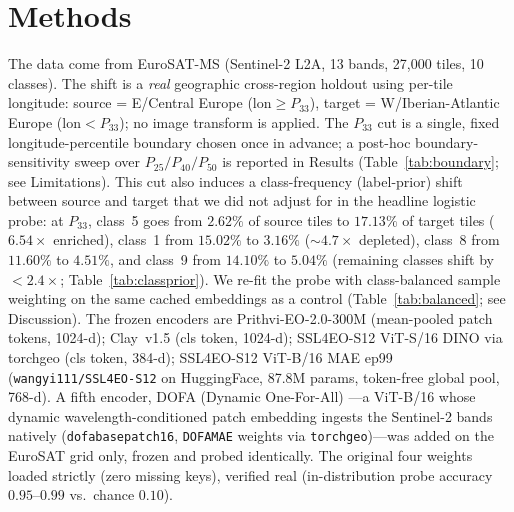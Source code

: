 \documentclass[journal]{IEEEtran}
\renewcommand{\_}{\textunderscore\allowbreak}
\begin{document}
\section{Methods}\label{sec:methods}
The data come from EuroSAT-MS \citep{helber2019eurosat} (Sentinel-2 L2A, 13 bands, 27{,}000 tiles, 10 classes). The shift is a
\emph{real} geographic cross-region holdout using per-tile longitude: source = E/Central Europe
($\mathrm{lon}\ge P_{33}$), target = W/Iberian-Atlantic Europe ($\mathrm{lon}<P_{33}$); no image transform is
applied. The $P_{33}$ cut is a single, fixed longitude-percentile boundary chosen once in advance; a post-hoc
boundary-sensitivity sweep over $P_{25}/P_{40}/P_{50}$ is reported in Results (Table~\ref{tab:boundary};
see Limitations). This cut also induces a class-frequency (label-prior) shift
between source and target that we did not adjust for in the headline logistic probe: at $P_{33}$, class~5
goes from $2.62\%$ of source tiles to $17.13\%$ of target tiles ($6.54\times$ enriched), class~1 from
$15.02\%$ to $3.16\%$ ($\sim\!4.7\times$ depleted), class~8 from $11.60\%$ to $4.51\%$, and class~9 from
$14.10\%$ to $5.04\%$ (remaining classes shift by ${<}2.4\times$; Table~\ref{tab:classprior}). We
re-fit the probe with class-balanced sample weighting on the same cached embeddings as a control
(Table~\ref{tab:balanced}; see Discussion). The frozen encoders are Prithvi-EO-2.0-300M \citep{szwarcman2024prithvi} (mean-pooled patch tokens, 1024-d); Clay~v1.5 \citep{clay2024model}
(cls token, 1024-d); SSL4EO-S12 \citep{wang2023ssl4eo} ViT-S/16 DINO via torchgeo (cls token, 384-d); SSL4EO-S12 \citep{wang2023ssl4eo} ViT-B/16 MAE ep99
(\texttt{wangyi111/SSL4EO-S12} on HuggingFace, 87.8M params, token-free global pool, 768-d). A fifth
encoder, DOFA (Dynamic One-For-All) \citep{xiong2024dofa}---a ViT-B/16 whose dynamic
wavelength-conditioned patch embedding ingests the Sentinel-2 bands natively (\texttt{dofa\_base\_patch16\_224},
\texttt{DOFA\_MAE} weights via \texttt{torchgeo})---was added on the EuroSAT grid only, frozen and probed
identically. The original four weights loaded strictly (zero missing keys), verified real (in-distribution probe accuracy
$0.95$--$0.99$ vs.\ chance $0.10$).
\end{document}
